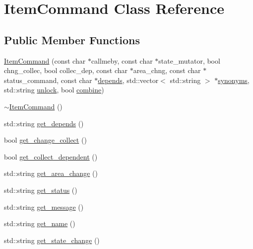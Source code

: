 \hypertarget{class_item_command}{
\section{\-Item\-Command \-Class \-Reference}
\label{class_item_command}
}
\subsection*{\-Public \-Member \-Functions}
\begin{DoxyCompactItemize}
\item 
\hyperlink{class_item_command_adb0c6cc33fce1d745c9da4b6d1796367}{\-Item\-Command} (const char $\ast$callmeby, const char $\ast$state\-\_\-mutator, bool chng\-\_\-collec, bool collec\-\_\-dep, const char $\ast$area\-\_\-chng, const char $\ast$status\-\_\-command, const char $\ast$\hyperlink{class_item_command_a6da1ba48131d1f2c414ad4728e7bb4c2}{depends}, std\-::vector$<$ std\-::string $>$ $\ast$\hyperlink{class_item_command_adc9ff7f20c2dec3f40bf5856d508cde2}{synonyms}, std\-::string \hyperlink{class_item_command_ab48cc2be6ad392f61a4cc09d8ddaa061}{unlock}, bool \hyperlink{classcombine}{combine})
\item 
\hyperlink{class_item_command_a3a7504fb83dbb0b1d708d80aa2c6cc47}{$\sim$\-Item\-Command} ()
\item 
std\-::string \hyperlink{class_item_command_aab2f239abd8e51eed941a7144c5a20f0}{get\-\_\-depends} ()
\item 
bool \hyperlink{class_item_command_a076738abba7d76c8b5e28f42e11b6df5}{get\-\_\-change\-\_\-collect} ()
\item 
bool \hyperlink{class_item_command_a478d2e1a02ea0b44e41e3d15e59e2156}{get\-\_\-collect\-\_\-dependent} ()
\item 
std\-::string \hyperlink{class_item_command_ac40efb86e5eab9229d2c343b308b6fa5}{get\-\_\-area\-\_\-change} ()
\item 
std\-::string \hyperlink{class_item_command_ad0a8c59554e3d4a7a14299fd7df8dc70}{get\-\_\-status} ()
\item 
std\-::string \hyperlink{class_item_command_a81079b514b0785ce9c86f8618f096c18}{get\-\_\-message} ()
\item 
std\-::string \hyperlink{class_item_command_ad19f0634b23480fcae2f05ee1a0f13f1}{get\-\_\-name} ()
\item 
std\-::string \hyperlink{class_item_command_aad1e85e694f5cd16cc11ad5acda2884e}{get\-\_\-state\-\_\-change} ()
\item 

\end{DoxyCompactItemize}
